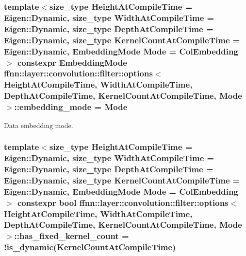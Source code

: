 \hypertarget{structffnn_1_1layer_1_1convolution_1_1filter_1_1options_a364919ad62fa093fbf5d142bd4f37d6e}{
\subsubsection[{embedding\-\_\-mode}]{\setlength{\rightskip}{0pt plus 5cm}template$<$size\-\_\-type Height\-At\-Compile\-Time = Eigen\-::\-Dynamic, size\-\_\-type Width\-At\-Compile\-Time = Eigen\-::\-Dynamic, size\-\_\-type Depth\-At\-Compile\-Time = Eigen\-::\-Dynamic, size\-\_\-type Kernel\-Count\-At\-Compile\-Time = Eigen\-::\-Dynamic, Embedding\-Mode Mode = Col\-Embedding$>$ constexpr {\bf Embedding\-Mode} {\bf ffnn\-::layer\-::convolution\-::filter\-::options}$<$ Height\-At\-Compile\-Time, Width\-At\-Compile\-Time, Depth\-At\-Compile\-Time, Kernel\-Count\-At\-Compile\-Time, Mode $>$\-::embedding\-\_\-mode = Mode\hspace{0.3cm}{\ttfamily [static]}}}\label{structffnn_1_1layer_1_1convolution_1_1filter_1_1options_a364919ad62fa093fbf5d142bd4f37d6e}


Data embedding mode. 

\hypertarget{structffnn_1_1layer_1_1convolution_1_1filter_1_1options_afe85a502882816dd562acd349c96b30e}{
\subsubsection[{has\-\_\-fixed\-\_\-kernel\-\_\-count}]{\setlength{\rightskip}{0pt plus 5cm}template$<$size\-\_\-type Height\-At\-Compile\-Time = Eigen\-::\-Dynamic, size\-\_\-type Width\-At\-Compile\-Time = Eigen\-::\-Dynamic, size\-\_\-type Depth\-At\-Compile\-Time = Eigen\-::\-Dynamic, size\-\_\-type Kernel\-Count\-At\-Compile\-Time = Eigen\-::\-Dynamic, Embedding\-Mode Mode = Col\-Embedding$>$ constexpr bool {\bf ffnn\-::layer\-::convolution\-::filter\-::options}$<$ Height\-At\-Compile\-Time, Width\-At\-Compile\-Time, Depth\-At\-Compile\-Time, Kernel\-Count\-At\-Compile\-Time, Mode $>$\-::has\-\_\-fixed\-\_\-kernel\-\_\-count = !{\bf is\-\_\-dynamic}(Kernel\-Count\-At\-Compile\-Time)\hspace{0.3cm}{\ttfamily [static]}}}\label{structffnn_1_1layer_1_1convolution_1_1filter_1_1options_afe85a502882816dd562acd349c96b30e}


